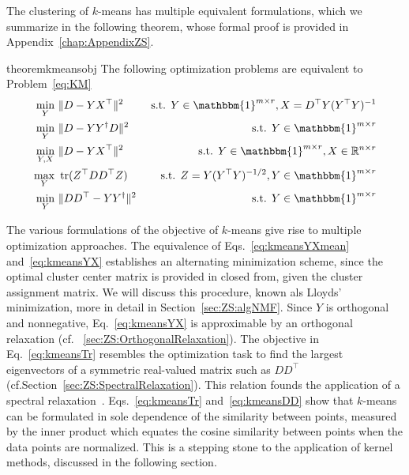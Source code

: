 The clustering of $k$-means has multiple equivalent formulations, which we summarize in the following theorem, whose formal proof is provided in Appendix~\ref{chap:AppendixZS}.
\begin{restatable}{theorem}{kmeansobj}\label{thm:kmeansobj}
The following optimization problems are equivalent to Problem~\eqref{eq:KM}
\begin{align}
\min_{Y}\ &\|D-YX^\top\|^2 &\text{ s.t. } Y\in\mathbbm{1}^{m\times r}, X=D^\top Y(Y^\top Y)^{-1} \label{eq:kmeansYXmean} \\
\min_{Y}\ &\|D-YY^\dagger D\|^2 &\text{ s.t. } Y\in\mathbbm{1}^{m\times r} \label{eq:kmeansYYdaggerD} \\
\min_{Y,X}\ &\|D-YX^\top\|^2 &\text{ s.t. } Y\in\mathbbm{1}^{m\times r}, X\in\mathbb{R}^{n\times r} \label{eq:kmeansYX} \\
\max_{Y}\ &\tr(Z^\top DD^\top Z)&\text{ s.t. } Z= Y(Y^\top Y)^{-1/2}, Y\in\mathbbm{1}^{m\times r} \label{eq:kmeansTr} \\
\min_{Y}\ &\|DD^\top - YY^\dagger\|^2 &\text{ s.t. }   Y\in\mathbbm{1}^{m\times r} \label{eq:kmeansDD}
\end{align}
\end{restatable}
The various formulations of the objective of $k$-means give rise to multiple optimization approaches. The equivalence of Eqs.~\eqref{eq:kmeansYXmean} and~\eqref{eq:kmeansYX} establishes an alternating minimization scheme, since the optimal cluster center matrix is provided in closed from, given the cluster assignment matrix. We will discuss this procedure, known als Lloyds' minimization, more in detail in Section~\ref{sec:ZS:algNMF}. Since $Y$ is orthogonal and nonnegative, Eq.~\eqref{eq:kmeansYX} is approximable by an orthogonal relaxation (cf. \@Section~\ref{sec:ZS:OrthogonalRelaxation}).
The objective in Eq.~\eqref{eq:kmeansTr} resembles the optimization task to find the largest eigenvectors of a symmetric real-valued matrix such as $DD^\top$ (cf.\@ Section~\ref{sec:ZS:SpectralRelaxation}). This relation founds the application of a spectral relaxation~\citep{zha2002spectral}. 
Eqs.~\@\eqref{eq:kmeansTr} and~\@\eqref{eq:kmeansDD} show that $k$-means can be formulated in sole dependence of the similarity between points, measured by the inner product which equates the cosine similarity between points when the data points are normalized. This is a stepping stone to the application of kernel methods, discussed in the following section.

